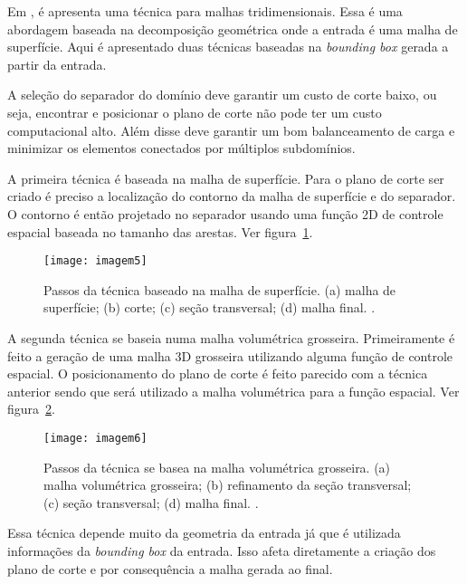Em \cite{bib:Glut08}, é apresenta uma técnica para malhas tridimensionais. Essa é uma abordagem baseada na decomposição geométrica onde a entrada é uma malha de superfície. Aqui é apresentado duas técnicas baseadas na \textit{bounding box} gerada a partir da entrada.

A seleção do separador do domínio deve garantir um custo de corte baixo, ou seja, encontrar e posicionar o plano de corte não pode ter um custo computacional alto. Além disse deve garantir um bom balanceamento de carga e minimizar os elementos conectados por múltiplos subdomínios.

A primeira técnica é baseada na malha de superfície. Para o plano de corte ser criado é preciso a localização do contorno da malha de superfície e do separador. O contorno é então projetado no separador usando uma função 2D de controle espacial baseada no tamanho das arestas. Ver figura~\ref{fig:imagem5}.

 \begin{figure}[htbp]
     \centering
     \texttt{[image: imagem5]}
     \caption{Passos da técnica baseado na malha de superfície. (a) malha de superfície; (b) corte; (c) seção transversal; (d) malha final. \cite{bib:Glut08}.}
     \label{fig:imagem5}
 \end{figure}

A segunda técnica se baseia numa malha volumétrica grosseira. Primeiramente é feito a geração de uma malha 3D grosseira utilizando alguma função de controle espacial. O posicionamento do plano de corte é feito parecido com a técnica anterior sendo que será utilizado a malha volumétrica para a função espacial. Ver figura~\ref{fig:imagem6}.

 \begin{figure}[htbp]
     \centering
     \texttt{[image: imagem6]}
     \caption{Passos da técnica se basea na malha volumétrica grosseira. (a) malha volumétrica grosseira; (b) refinamento da seção transversal; (c) seção transversal; (d) malha final. \cite{bib:Glut08}.}
     \label{fig:imagem6}
 \end{figure}

Essa técnica depende muito da geometria da entrada já que é utilizada informações da \textit{bounding box} da entrada. Isso afeta diretamente a criação dos plano de corte e por consequência a malha gerada ao final.

